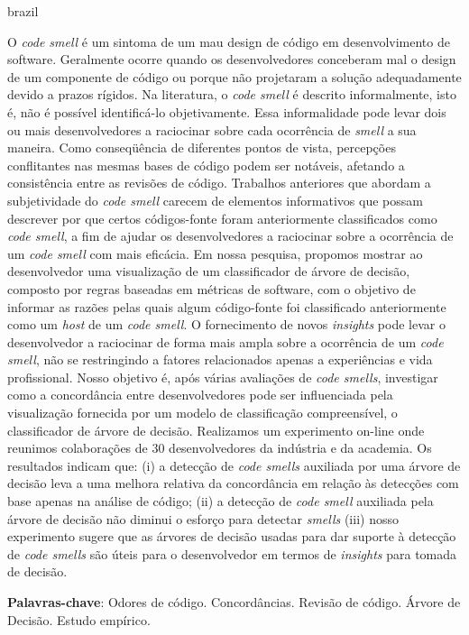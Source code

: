 \begin{resumo}[Resumo]
    \begin{otherlanguage*}{brazil}

    \noindent O \textit{code smell} é um sintoma de um mau design de código em desenvolvimento de software. Geralmente ocorre quando os desenvolvedores conceberam mal o design de um componente de código ou porque não projetaram a solução adequadamente devido a prazos rígidos. Na literatura, o \textit{code smell} é descrito informalmente, isto é, não é possível identificá-lo objetivamente. Essa informalidade pode levar dois ou mais desenvolvedores a raciocinar sobre cada ocorrência de \textit{smell} a sua maneira. Como conseqüência de diferentes pontos de vista, percepções conflitantes nas mesmas bases de código podem ser notáveis, afetando a consistência entre as revisões de código. 
    Trabalhos anteriores que abordam a subjetividade do \textit{code smell} carecem de elementos informativos que possam descrever por que certos códigos-fonte foram anteriormente classificados como \textit{code smell}, a fim de ajudar os desenvolvedores a raciocinar sobre a ocorrência de um \textit{code smell} com mais eficácia. Em nossa pesquisa, propomos mostrar ao desenvolvedor uma visualização de um classificador de árvore de decisão, composto por regras baseadas em métricas de software, com o objetivo de informar as razões pelas quais algum código-fonte foi classificado anteriormente como um \textit{host} de um \textit{code smell}. O fornecimento de novos \textit{insights} pode levar o desenvolvedor a raciocinar de forma mais ampla sobre a ocorrência de um \textit{code smell}, não se restringindo a fatores relacionados apenas a experiências e vida profissional. Nosso objetivo é, após várias avaliações de \textit{code smells}, investigar como a concordância entre desenvolvedores pode ser influenciada pela visualização fornecida por um modelo de classificação compreensível, o classificador de árvore de decisão. Realizamos um experimento on-line onde reunimos colaborações de 30 desenvolvedores da indústria e da academia. Os resultados indicam que: (i) a detecção de \textit{code smells} auxiliada por uma árvore de decisão leva a uma melhora relativa da concordância em relação às detecções com base apenas na análise de código; (ii) a detecção de \textit{code smell} auxiliada pela árvore de decisão não diminui o esforço para detectar \textit{smells} (iii) nosso experimento sugere que as árvores de decisão usadas para dar suporte à detecção de \textit{code smells} são úteis para o desenvolvedor em termos de \textit{insights} para tomada de decisão.
    
    \textbf{Palavras-chave}: Odores de código. Concordâncias. Revisão de código. Árvore de Decisão. Estudo empírico.

    \end{otherlanguage*}
\end{resumo}



